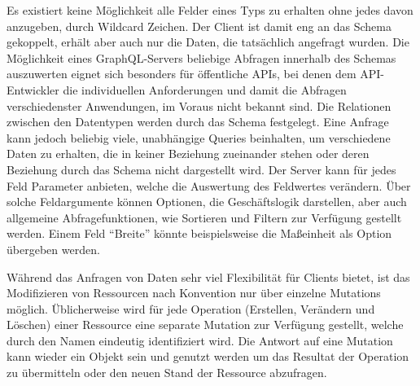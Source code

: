 Es existiert keine Möglichkeit alle Felder eines Typs zu erhalten ohne jedes davon anzugeben, \zB{} durch Wildcard Zeichen.
Der Client ist damit eng an das Schema gekoppelt, erhält aber auch nur die Daten, die tatsächlich angefragt wurden.
Die Möglichkeit eines GraphQL-Servers beliebige Abfragen innerhalb des Schemas auszuwerten eignet sich besonders für öffentliche APIs, bei denen dem API-Entwickler die individuellen Anforderungen und damit die Abfragen verschiedenster Anwendungen, im Voraus nicht bekannt sind.
Die Relationen zwischen den Datentypen werden durch das Schema festgelegt.
Eine Anfrage kann jedoch beliebig viele, unabhängige Queries beinhalten, \zB{} um verschiedene Daten zu erhalten, die in keiner Beziehung zueinander stehen oder deren Beziehung durch das Schema nicht dargestellt wird.
Der Server kann für jedes Feld Parameter anbieten, welche die Auswertung des Feldwertes verändern. Über solche Feldargumente können Optionen, die Geschäftslogik darstellen, aber auch allgemeine Abfragefunktionen, wie \zB{} Sortieren und Filtern zur Verfügung gestellt werden.
Einem Feld \enquote{Breite} könnte beispielsweise die Maßeinheit als Option übergeben werden.
\par
Während das Anfragen von Daten sehr viel Flexibilität für Clients bietet, ist das Modifizieren von Ressourcen nach Konvention nur über einzelne Mutations möglich.
Üblicherweise wird für jede Operation (Erstellen, Verändern und Löschen) einer Ressource eine separate Mutation zur Verfügung gestellt, welche durch den Namen eindeutig identifiziert wird.
Die Antwort auf eine Mutation kann wieder ein Objekt sein und genutzt werden um das Resultat der Operation zu übermitteln oder den neuen Stand der Ressource abzufragen.
\par


